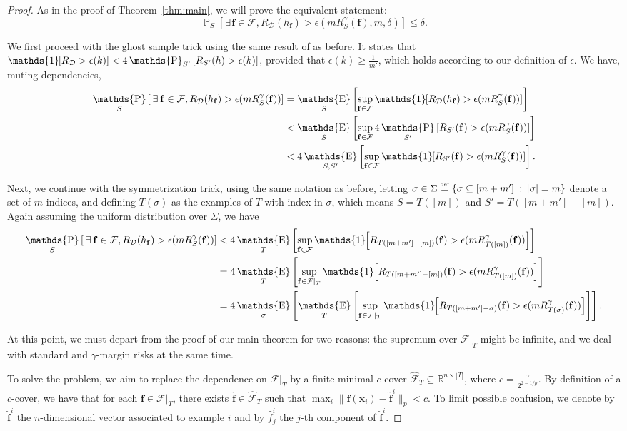 \documentclass[twoside,11pt]{article}
\newcommand{\Id}[1]{\mathds{1}\hspace{-2.5pt}\left[#1\right]}
\let\oldexists=\exists
\renewcommand{\exists}{\hspace{1pt}\oldexists\hspace{1pt}}
\newcommand{\abs}[1]{\left|#1\right|}
\newcommand{\D}{\mathcal{D}}
\newcommand{\F}{\mathcal{F}}
\newcommand{\f}{\mathbf{f}}
\newcommand{\x}{\mathbf{x}}
\newcommand{\fhat}{\hat{\f}}
\newcommand{\fcover}{\widehat{\F}_T}
\newcommand{\reals}{\mathds{R}}
\newcommand{\eqdef}{\overset{\smash{\mbox{\tiny \rm def}}}{=}}
\DeclareMathOperator*{\Prob}{\mathds{P}}
\newcommand{\prob}[2]{\Prob_{#1}\left[#2\right]}
\DeclareMathOperator*{\Expectation}{\mathds{E}}
\newcommand{\exv}[2]{\Expectation_{#1}\left[#2\right]}
\begin{document}
\begin{proof}
As in the proof of Theorem~\ref{thm:main}, we will prove the equivalent statement:
\begin{equation*}
\prob{S}{ \exists \f \in \F, R_\D(h_\f) > \epsilon(m R^\gamma_S(\f), m, \delta) } \le \delta.
\end{equation*}

We first proceed with the ghost sample trick using the same result of \cite{greenberg14} as before.
It states that $\Id{R_\D > \epsilon(k)} < 4\prob{S'}{R_{S'}(h)> \epsilon(k)}$, provided that $\epsilon(k) \ge \frac{1}{m'}$, which holds according to our definition of $\epsilon$.
We have, muting dependencies,
\begin{align*}
\prob{S}{ \exists \f \in \F, R_\D(h_\f) > \epsilon(m R^\gamma_S(\f)) }
&= \exv{S}{ \sup_{\f\in\F} \Id{R_\D(h_\f) > \epsilon(m R^\gamma_S(\f))} }\\
&< \exv{S}{ \sup_{\f\in\F} 4 \prob{S'}{R_{S'}(\f) > \epsilon(m R^\gamma_S(\f))} }\\
&< 4 \exv{S,S'}{ \sup_{\f\in\F} \Id{R_{S'}(\f) > \epsilon(m R^\gamma_S(\f))} }.
\end{align*}

Next, we continue with the symmetrization trick, using the same notation as before, letting $\sigma \in \Sigma \eqdef \{ \sigma \subseteq [m + m'] \: : \: \abs{\sigma} = m \}$ denote a set of $m$ indices, and defining $T(\sigma)$ as the examples of $T$ with index in $\sigma$, which means $S=T([m])$ and $S'=T([m+m']-[m])$.
Again assuming the uniform distribution over $\Sigma$, we have
\begin{align*}
\prob{S}{ \exists \f \in \F, R_\D(h_\f) > \epsilon(m R^\gamma_S(\f)) }
&< 4 \exv{T}{ \sup_{\f\in\F} \Id{R_{T([m+m']-[m])}(\f) > \epsilon(m R^\gamma_{T([m])}(\f))} }\\
&= 4 \exv{T}{ \sup_{\f\in\F|_T} \Id{R_{T([m+m']-[m])}(\f) > \epsilon(m R^\gamma_{T([m])}(\f))} }\\
&= 4 \exv{\sigma}{\exv{T}{ \sup_{\f\in\F|_T} \Id{R_{T([m+m']-\sigma)}(\f) > \epsilon(m R^\gamma_{T(\sigma)}(\f))} }}.
\end{align*}

At this point, we must depart from the proof of our main theorem for two reasons: the supremum over $\F|_T$ might be infinite, and we deal with standard and $\gamma$-margin risks at the same time.

To solve the problem, we aim to replace the dependence on $\F|_T$ by a finite minimal $c$-cover $\fcover\subseteq \reals^{n\times \abs{T}}$, where $c=\frac{\gamma}{2^{2-1/p}}$.
By definition of a $c$-cover, we have that for each $\f \in \F|_T$, there exists $\fhat \in \fcover$ such that $\max_i \lVert\f(\x_i) - \fhat^i\rVert_p < c$.
To limit possible confusion, we denote by $\fhat^i$ the $n$-dimensional vector associated to example $i$ and by $\hat{f}_j^i$ the $j$-th component of $\fhat^i$.


\end{proof}
\end{document}
